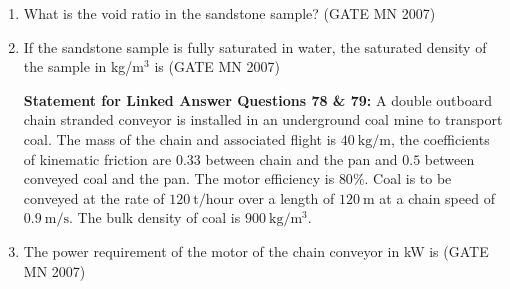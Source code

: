 \documentclass[journal]{IEEEtran}
\begin{document}
\begin{enumerate}
\item What is the void ratio in the sandstone sample? 
	\hfill (GATE MN 2007)
    \begin{enumerate}
    \end{enumerate}


    \item If the sandstone sample is fully saturated in water, the saturated density of the sample in kg/m$^3$ is  
	    \hfill (GATE MN 2007)
    \begin{enumerate}
    \end{enumerate}



\textbf{Statement for Linked Answer Questions 78 \& 79:} A double outboard chain stranded conveyor is installed in an underground coal mine to transport coal. 
The mass of the chain and associated flight is $40 \ \mathrm{kg/m}$, the coefficients of kinematic friction are $0.33$ between chain and the pan and $0.5$ between conveyed coal and the pan. 
The motor efficiency is $80\%$. 
Coal is to be conveyed at the rate of $120 \ \mathrm{t/hour}$ over a length of $120 \ \mathrm{m}$ at a chain speed of $0.9 \ \mathrm{m/s}$. 
The bulk density of coal is $900 \ \mathrm{kg/m^3}$.
\item The power requirement of the motor of the chain conveyor in kW is  
	\hfill (GATE MN 2007)
\begin{enumerate}
\end{enumerate}



\end{enumerate}
\end{document}
